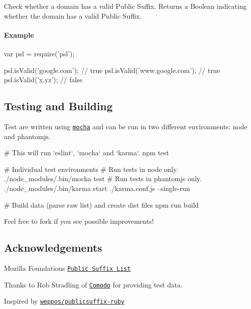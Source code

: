 Check whether a domain has a valid Public Suffix. Returns a {\ttfamily Boolean} indicating whether the domain has a valid Public Suffix.

\paragraph*{Example}


\begin{DoxyCode}
var psl = require('psl');

psl.isValid('google.com'); // true
psl.isValid('www.google.com'); // true
psl.isValid('x.yz'); // false
\end{DoxyCode}


\subsection*{Testing and Building}

Test are written using \href{https://mochajs.org/}{\tt {\ttfamily mocha}} and can be run in two different environments\+: {\ttfamily node} and {\ttfamily phantomjs}.


\begin{DoxyCode}
# This will run `eslint`, `mocha` and `karma`.
npm test

# Individual test environments
# Run tests in node only.
./node\_modules/.bin/mocha test
# Run tests in phantomjs only.
./node\_modules/.bin/karma start ./karma.conf.js --single-run

# Build data (parse raw list) and create dist files
npm run build
\end{DoxyCode}


Feel free to fork if you see possible improvements!

\subsection*{Acknowledgements}


\begin{DoxyItemize}
\item Mozilla Foundation\textquotesingle{}s \href{https://publicsuffix.org/}{\tt Public Suffix List}
\item Thanks to Rob Stradling of \href{https://www.comodo.com/}{\tt Comodo} for providing test data.
\item Inspired by \href{https://github.com/weppos/publicsuffix-ruby}{\tt weppos/publicsuffix-\/ruby}
\end{DoxyItemize}

